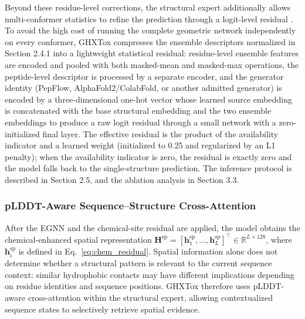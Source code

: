 \documentclass[12pt]{article}
\begin{document}
Beyond these residue-level corrections, the structural expert additionally
allows multi-conformer statistics to refine the prediction through a
logit-level residual \cite{he2016deepresidual}. To avoid the high cost of
running the complete geometric network independently on every conformer,
GHXTox compresses the ensemble descriptors normalized in Section 2.4.1 into a
lightweight statistical residual: residue-level ensemble features are encoded
and pooled with both masked-mean and masked-max operations, the peptide-level
descriptor is processed by a separate encoder, and the generator identity
(PepFlow, AlphaFold2/ColabFold, or another admitted generator) is encoded by a
three-dimensional one-hot vector whose learned source embedding is
concatenated with the base structural embedding and the two ensemble
embeddings to produce a raw logit residual through a small network with a
zero-initialized final layer. The effective residual is the product of the
availability indicator and a learned weight (initialized to 0.25 and
regularized by an L1 penalty); when the availability indicator is zero, the
residual is exactly zero and the model falls back to the single-structure
prediction. The inference protocol is described in Section 2.5, and the ablation analysis in Section 3.3.

\subsubsection{pLDDT-Aware Sequence--Structure Cross-Attention}
After the EGNN and the chemical-site residual are applied, the model obtains
the chemical-enhanced spatial representation
$\mathbf H^{\mathrm{sp}} = [\mathbf h_1^{\mathrm{sp}}, \ldots,
\mathbf h_L^{\mathrm{sp}}]^{\top} \in \mathbb{R}^{L \times 128}$, where
$\mathbf h_i^{\mathrm{sp}}$ is defined in Eq.~\eqref{eq:chem_residual}.
Spatial information alone does not determine whether a structural pattern is
relevant to the current sequence context: similar hydrophobic contacts may
have different implications depending on residue identities and sequence
positions. GHXTox therefore uses pLDDT-aware cross-attention within
the structural expert, allowing contextualized sequence states to selectively
retrieve spatial evidence.
\end{document}
